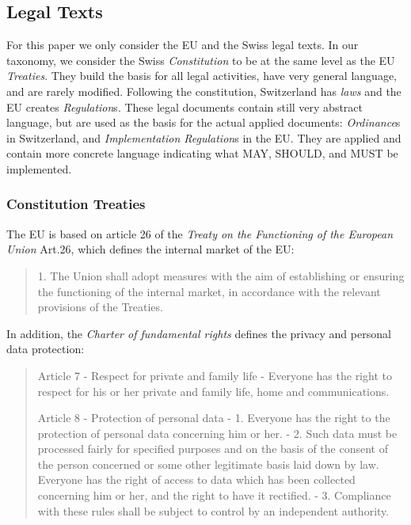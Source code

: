 \subsection{Legal Texts} 

For this paper we only consider the EU and the Swiss legal texts.
In our taxonomy, we consider the Swiss \emph{Constitution} to be
at the same level as the EU \emph{Treaties}.
They build the basis for all legal activities, have very general
language, and are rarely modified.
Following the constitution, Switzerland has \emph{laws} and the EU
creates \emph{Regulation}s.
These legal documents contain still very abstract language, but
are used as the basis for the actual applied documents:
\emph{Ordinance}s in Switzerland, and 
\emph{Implementation Regulation}s in the EU.
They are applied and contain more concrete language
indicating what MAY, SHOULD, and MUST be implemented.

\vspace{1cm}


\subsubsection{Constitution Treaties}

The EU \eid{} is based on article 26 of the \emph{Treaty on the Functioning of the European Union}
\cite{EUTreaties}{Art.26}, which defines the internal market of the EU:
\begin{quote}
    1.   The Union shall adopt measures with the aim of establishing or ensuring the functioning of the internal market, in accordance with the relevant provisions of the Treaties.
\end{quote}
In addition, the \emph{Charter of fundamental rights} defines the privacy and personal data protection:
\begin{quote}
    Article 7 - Respect for private and family life - Everyone has the right to respect for his or her private and family life, home and communications.
    
    Article 8 - Protection of personal data - 1.   Everyone has the right to the protection of personal data concerning him or her.
    - 2.   Such data must be processed fairly for specified purposes and on the basis of the consent of the person concerned or some other legitimate basis laid down by law. Everyone has the right of access to data which has been collected concerning him or her, and the right to have it rectified. - 3.   Compliance with these rules shall be subject to control by an independent authority.
\end{quote}

